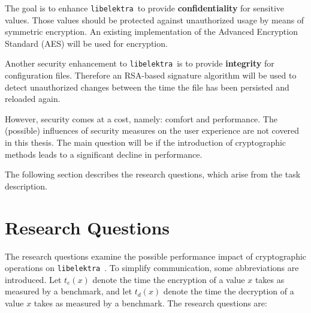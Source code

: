\documentclass[a4paper,12pt]{article}
\newcommand{\libelektra}{\texttt{libelektra}~}
\begin{document}
The goal is to enhance \libelektra to provide \textbf{confidentiality} for sensitive values.
Those values should be protected against unauthorized usage by means of symmetric encryption.
An existing implementation of the Advanced Encryption Standard (AES) will be used for encryption.

Another security enhancement to \libelektra is to provide \textbf{integrity} for configuration files.
Therefore an RSA-based signature algorithm will be used to detect unauthorized changes between the time the file has been persisted and reloaded again.

However, security comes at a cost, namely: comfort and performance.
The (possible) influences of security measures on the user experience are not covered in this thesis.
The main question will be if the introduction of cryptographic methods leads to a significant decline in performance.

The following section describes the research questions, which arise from the task description.


\section{Research Questions}

The research questions examine the possible performance impact of cryptographic operations on \libelektra.
To simplify communication, some abbreviations are introduced. 
Let $t_e(x)$ denote the time the encryption of a value $x$ takes as measured by a benchmark, and let $t_d(x)$ denote the time the decryption of a value $x$ takes as measured by a benchmark.
The research questions are:
\end{document}
